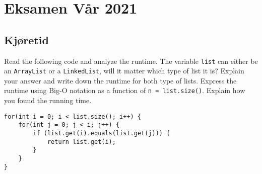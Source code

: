 \documentclass{article}
\begin{document}
\section{Eksamen Vår 2021}
    \subsection{Kjøretid}

    Read the following code and analyze the runtime. The variable \texttt{list} can either be an \texttt{ArrayList} or a \texttt{LinkedList}, will it matter which type of list it is? Explain your answer and write down the runtime for both type of lists. Express the runtime using Big-O notation as a function of \texttt{n = list.size()}. Explain how you found the running time.

    \begin{lstlisting}
for(int i = 0; i < list.size(); i++) {
    for(int j = 0; j < i; j++) {
        if (list.get(i).equals(list.get(j))) {
            return list.get(i);
        }
    }
}
    \end{lstlisting}
\end{document}
